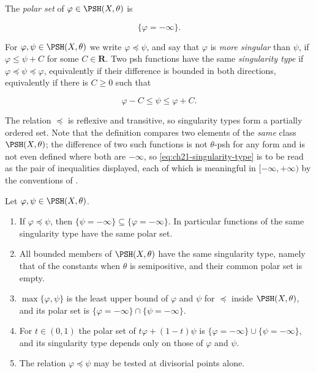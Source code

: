 \begin{definition}
\label{def:ch21-polar-singularity}
The \emph{polar set} of $\varphi\in\PSH(X,\theta)$ is

\[
                         \{\varphi=-\infty\}.
\]

For $\varphi,\psi\in\PSH(X,\theta)$ we write $\varphi\preceq\psi$, and
say that $\varphi$ is \emph{more singular} than $\psi$, if
$\varphi\leq\psi+C$ for some $C\in\mathbf R$.  Two psh functions have
the same \emph{singularity type} if
$\varphi\preceq\psi\preceq\varphi$, equivalently if their difference
is bounded in both directions, equivalently if there is $C\geq0$ such that

\begin{equation}
\label{eq:ch21-singularity-type}
                         \varphi-C\leq\psi\leq\varphi+C.
\end{equation}
\end{definition}

The relation $\preceq$ is reflexive and transitive, so singularity types
form a partially ordered set.  Note that the definition compares two
elements of the \emph{same} class $\PSH(X,\theta)$; the difference of two
such functions is not $\theta$-psh for any form and is not even defined
where both are $-\infty$, so \eqref{eq:ch21-singularity-type} is to be
read as the pair of inequalities displayed, each of which is meaningful in
$[-\infty,+\infty)$ by the conventions of
.

\begin{proposition}
\label{prop:ch21-singularity-elementary}
Let $\varphi,\psi\in\PSH(X,\theta)$.
\begin{enumerate}
\item\label{itm:ch21-sing:polar}
If $\varphi\preceq\psi$, then
$\{\psi=-\infty\}\subseteq\{\varphi=-\infty\}$.  In particular functions
of the same singularity type have the same polar set.
\item\label{itm:ch21-sing:bounded}
All bounded members of $\PSH(X,\theta)$ have the same singularity type,
namely that of the constants when $\theta$ is semipositive, and their
common polar set is empty.
\item\label{itm:ch21-sing:max}
$\max\{\varphi,\psi\}$ is the least upper bound of $\varphi$ and
$\psi$ for $\preceq$ inside $\PSH(X,\theta)$, and its polar set is
$\{\varphi=-\infty\}\cap\{\psi=-\infty\}$.
\item\label{itm:ch21-sing:convex}
For $t\in(0,1)$ the polar set of $t\varphi+(1-t)\psi$ is
$\{\varphi=-\infty\}\cup\{\psi=-\infty\}$, and its singularity type
depends only on those of $\varphi$ and $\psi$.
\item\label{itm:ch21-sing:divisorial}
The relation $\varphi\preceq\psi$ may be tested at divisorial points
alone.
\end{enumerate}
\end{proposition}

